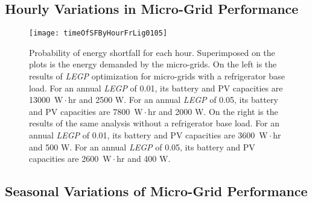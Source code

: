 \documentclass{article}
\newcommand{\unit}[1]{\ensuremath{\, \mathrm{#1}}}
\begin{document}
\subsection{Hourly Variations in Micro-Grid Performance}

	

\begin{figure}[ht]
\centering
\texttt{[image: timeOfSFByHourFrLig0105]}
\caption{Probability of energy shortfall for each hour. 
Superimposed on the plots is the energy demanded by the micro-grids. 
On the left is the results of \emph{LEGP} optimization for micro-grids with a refrigerator base load. 
For an annual \emph{LEGP} of 0.01, its battery and PV capacities are 13000 \unit{W \! \cdot \!hr} and 2500 W.
For an annual \emph{LEGP} of 0.05, its battery and PV capacities are 7800 \unit{W \! \cdot \!hr} and 2000 W.
On the right is the results of the same analysis without a refrigerator base load. 
For an annual \emph{LEGP} of 0.01, its battery and PV capacities are 3600 \unit{W \! \cdot \!hr} and 500 W.
For an annual \emph{LEGP} of 0.05, its battery and PV capacities are 2600 \unit{W \! \cdot \!hr} and 400 W.}
\label{hourlyLEGP}
\end{figure} 

\subsection{Seasonal Variations of Micro-Grid Performance}
\end{document}
